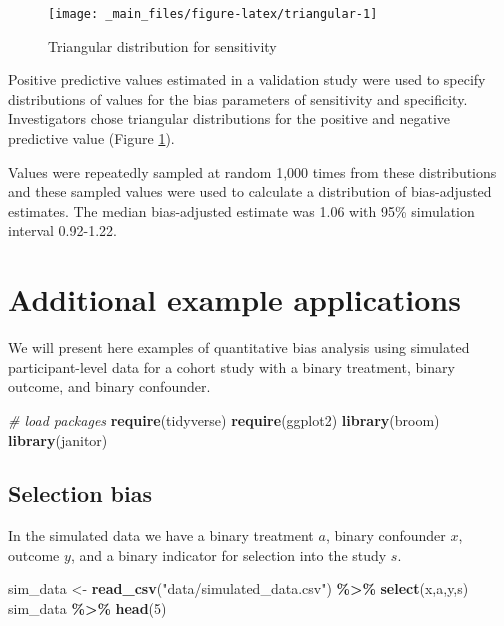 \documentclass[
]{book}
\newenvironment{Shaded}{\begin{snugshade}}{\end{snugshade}}
\newcommand{\CommentTok}[1]{\textcolor[rgb]{0.56,0.35,0.01}{\textit{#1}}}
\newcommand{\DecValTok}[1]{\textcolor[rgb]{0.00,0.00,0.81}{#1}}
\newcommand{\FunctionTok}[1]{\textcolor[rgb]{0.13,0.29,0.53}{\textbf{#1}}}
\newcommand{\NormalTok}[1]{#1}
\newcommand{\OtherTok}[1]{\textcolor[rgb]{0.56,0.35,0.01}{#1}}
\newcommand{\SpecialCharTok}[1]{\textcolor[rgb]{0.81,0.36,0.00}{\textbf{#1}}}
\newcommand{\StringTok}[1]{\textcolor[rgb]{0.31,0.60,0.02}{#1}}
\begin{document}
\begin{figure}

{\centering \texttt{[image: \_main\_files/figure-latex/triangular-1]} 

}

\caption{Triangular distribution for sensitivity}\label{fig:triangular}
\end{figure}

Positive predictive values estimated in a validation study were used to specify distributions of values for the bias parameters of sensitivity and specificity. Investigators chose triangular distributions for the positive and negative predictive value (Figure \ref{fig:triangular}).

Values were repeatedly sampled at random 1,000 times from these distributions and these sampled values were used to calculate a distribution of bias-adjusted estimates. The median bias-adjusted estimate was 1.06 with 95\% simulation interval 0.92-1.22.

\hypertarget{additional-examples}{%
\chapter{Additional example applications}\label{additional-examples}}

We will present here examples of quantitative bias analysis using simulated participant-level data for a cohort study with a binary treatment, binary outcome, and binary confounder.

\begin{Shaded}
\begin{Highlighting}[]
\CommentTok{\# load packages}
\FunctionTok{require}\NormalTok{(tidyverse)}
\FunctionTok{require}\NormalTok{(ggplot2)}
\FunctionTok{library}\NormalTok{(broom) }
\FunctionTok{library}\NormalTok{(janitor)}
\end{Highlighting}
\end{Shaded}

\hypertarget{selection-bias}{%
\section{Selection bias}\label{selection-bias}}

In the simulated data we have a binary treatment \(a\), binary confounder \(x\), outcome \(y\), and a binary indicator for selection into the study \(s\).

\begin{Shaded}
\begin{Highlighting}[]
\NormalTok{sim\_data }\OtherTok{\textless{}{-}} \FunctionTok{read\_csv}\NormalTok{(}\StringTok{"data/simulated\_data.csv"}\NormalTok{) }\SpecialCharTok{\%\textgreater{}\%} \FunctionTok{select}\NormalTok{(x,a,y,s)}
\NormalTok{sim\_data  }\SpecialCharTok{\%\textgreater{}\%} \FunctionTok{head}\NormalTok{(}\DecValTok{5}\NormalTok{)}
\end{Highlighting}
\end{Shaded}
\end{document}

